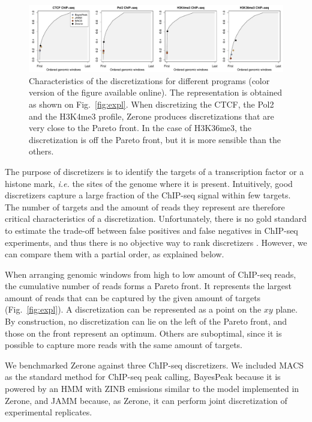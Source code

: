 \documentclass{bioinfo}
\begin{document}
\begin{figure}[!tbp]
\centerline{\includegraphics[scale=0.4]{pareto_front.pdf}}
\caption{
  Characteristics of the discretizations for different programs
  (color version of the figure available online).
  The representation is obtained as shown on Fig.~\ref{fig:expl}.
  When discretizing the CTCF, the Pol2 and the H3K4me3 profile,
  Zerone produces discretizations that are very close to the Pareto
  front. In the case of H3K36me3, the discretization is off the
  Pareto front, but it is more sensible than the others.
}
\label{fig:pareto}
\end{figure}

The purpose of discretizers is to identify the targets of a
transcription factor or a histone mark, \textit{i.e.} the sites of
the genome where it is present.
Intuitively, good discretizers capture a large fraction of the
ChIP-seq signal within few targets. The number of targets
and the amount of reads they represent are therefore critical
characteristics of a discretization. Unfortunately, there is no gold
standard to estimate the trade-off between false positives and false
negatives in ChIP-seq experiments, and thus there is no objective way
to rank discretizers \citep{pmid21059603}. However, we can compare
them with a partial order, as explained below.

When arranging genomic windows from high to low amount of ChIP-seq
reads, the cumulative number of reads forms a Pareto front.
It represents the largest amount of reads that can be captured by the
given amount of targets (Fig.~\ref{fig:expl}). A discretization can
be represented as a point on the $xy$ plane.  By construction, no
discretization can lie on the left of the Pareto front, and those on
the front represent an optimum. Others are suboptimal, since it is
possible to capture more reads with the same amount of targets.

We benchmarked Zerone against three ChIP-seq discretizers.
We included MACS as the standard method for ChIP-seq peak calling,
BayesPeak because it is powered by an HMM with ZINB emissions
similar to the model implemented in Zerone, and JAMM because, as
Zerone, it can perform joint discretization of experimental replicates.
\end{document}
